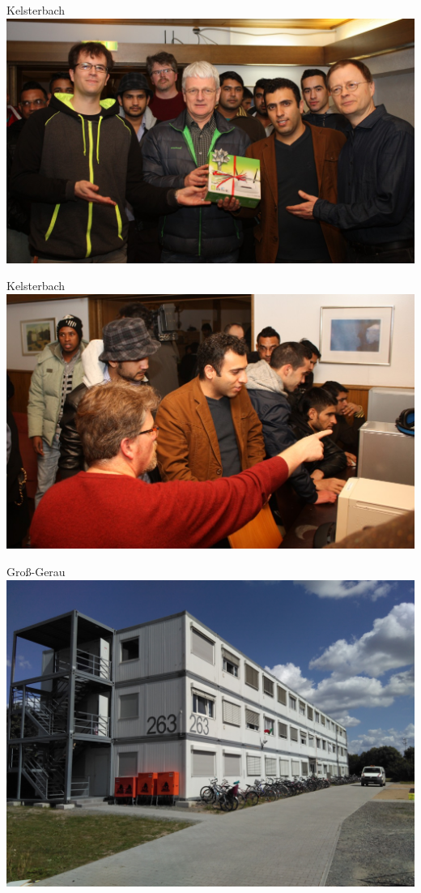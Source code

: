 \documentclass[t]{beamer}
\begin{document}
  \begin{frame}{Kelsterbach}
    \center
    \includegraphics[height=0.7\textheight]{images/ffkelsterbach-airporthotel-pressefoto.jpg}
  \end{frame}

  \begin{frame}{Kelsterbach}
    \center
    \includegraphics[height=0.75\textheight]{images/ffkelsterbach-airporthotel-internetcafee.jpg}
  \end{frame}

  \begin{frame}{Groß-Gerau}
    \center
    \includegraphics[height=0.75\textheight]{images/2016-08-08_ggsportpark.jpg}
  \end{frame}
\end{document}
